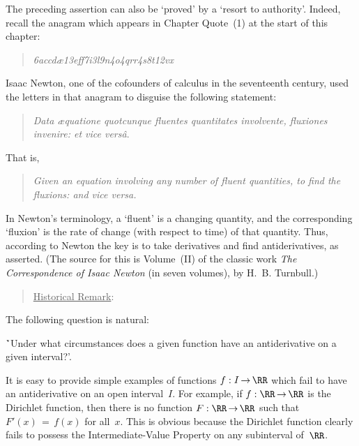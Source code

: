 {{        The preceding assertion can also be `proved' by a `resort to authority'.
    Indeed, recall the anagram which appears in Chapter Quote~(1) at the start of this chapter:

\begin{quotation}
{\footnotesize
        {\em 6accd{\ae}13eff7i3l9n4o4qrr4s8t12vx}
}%
\end{quotation}

\noindent Isaac Newton, one of the cofounders of calculus in the seventeenth century, used the letters in that anagram to disguise the following statement:

\begin{quotation}
{\footnotesize
      {\em Data {\ae}quatione quotcunque fluentes quantitates involvente, fluxiones invenire: et vice vers\^{a}}.
}%
\end{quotation}

    That is,
\begin{quotation}
{\footnotesize 
    \em Given an equation involving any number of fluent quantities, to find the fluxions: and vice versa.
}%
\end{quotation}

        In Newton's terminology, a `fluent' is a changing quantity, and the corresponding `fluxion' is the rate of change (with respect to time) of that quantity.
    Thus, according to Newton the key is to take derivatives and find antiderivatives, as asserted.
    (The source for this is Volume~(II) of the classic work {\em The Correspondence of Isaac Newton} (in seven volumes), by H.~B. Turnbull.)
}%

\begin{quotation}
{\footnotesize \underline{Historical Remark}: 

}%
\end{quotation}

\VV

        The following question is natural:

\VA

        \h `Under what circumstances does a given function have an antiderivative on a given interval?'.

\VA

\noindent It is easy to provide simple examples of functions $f:I \,{\rightarrow}\, {\RR}$
    which fail to have an antiderivative on an open interval~$I$. For example, if $f:{\RR} \,{\rightarrow}\, {\RR}$ is the Dirichlet function,
    then there is no function $F:{\RR} \,{\rightarrow}\, {\RR}$ such that $F'(x) \,=\, f(x)$ for all~$x$.
    This is obvious because the Dirichlet function clearly fails to possess the Intermediate-Value Property on any subinterval of~${\RR}$.

}
